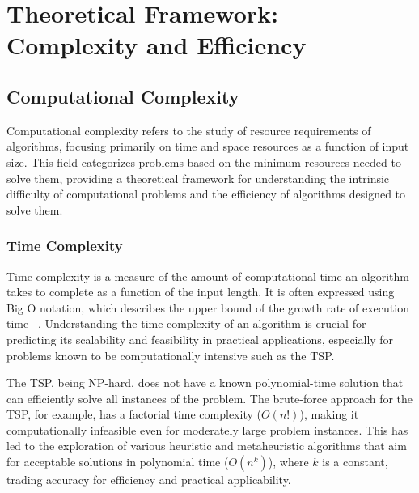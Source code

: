 
%

\chapter{Theoretical Framework: Complexity and Efficiency}\label{chapt:2}



\section{Computational Complexity}

Computational complexity refers to the study of resource requirements of algorithms, focusing primarily on time and space resources as a function of input size. This field categorizes problems based on the minimum resources needed to solve them, providing a theoretical framework for understanding the intrinsic difficulty of computational problems and the efficiency of algorithms designed to solve them. ~\cite{GareyJohnson1979}

\subsection{Time Complexity}

Time complexity is a measure of the amount of computational time an algorithm takes to complete as a function of the input length. It is often expressed using Big O notation, which describes the upper bound of the growth rate of execution time ~\cite{BigONotation}. Understanding the time complexity of an algorithm is crucial for predicting its scalability and feasibility in practical applications, especially for problems known to be computationally intensive such as the \Gls{TSP}.

The \Gls{TSP}, being \Gls{NP}-hard, does not have a known polynomial-time solution that can efficiently solve all instances of the problem. The brute-force approach for the \Gls{TSP}, for example, has a factorial time complexity (\(O(n!)\)), making it computationally infeasible even for moderately large problem instances. This has led to the exploration of various heuristic and metaheuristic algorithms that aim for acceptable solutions in polynomial time (\(O(n^k)\)), where \(k\) is a constant, trading accuracy for efficiency and practical applicability.~\cite{Dorigo1996}



